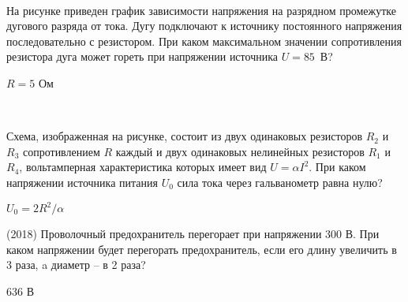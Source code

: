 \begin{ex}
\hspace{0pt} \\
\begin{minipage}{.65\textwidth}
На рисунке приведен график зависимости напряжения на разрядном промежутке дугового разряда от тока. Дугу подключают  к источнику постоянного напряжения последовательно с резистором. 
При каком максимальном значении сопротивления резистора дуга может гореть при напряжении источника $U =85$~В?
\end{minipage}
\begin{minipage}{.35\textwidth}
\centering

\end{minipage}
\begin{ans}
$R = 5$ Ом
\end{ans}
\end{ex}

\begin{ex}
\hspace{0pt} \\
\begin{minipage}{.65\textwidth}
Схема, изображенная на рисунке, состоит из двух одинаковых резисторов $R_2$ и $R_3$ сопротивлением $R$ каждый и двух одинаковых нелинейных резисторов $R_1$ и $R_4$, вольтамперная характеристика которых имеет вид $U = \alpha I^2$. При каком напряжении источника питания $U_0$ сила тока через гальванометр равна нулю?
\end{minipage}
\begin{minipage}{.35\textwidth}
\centering

\end{minipage}
\begin{ans}
$U_0 = 2R^2/\alpha$
\end{ans}
\end{ex}

\begin{ex}
(2018) Проволочный предохранитель перегорает при напряжении 300 В. При каком напряжении будет перегорать предохранитель, если его длину увеличить в 3 раза, a диаметр -- в 2 раза?
\begin{ans}
636 В
\end{ans}
\end{ex}
